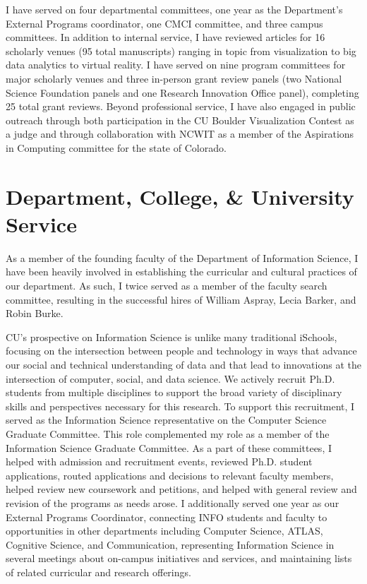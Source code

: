 \documentclass[11pt]{article}
\begin{document}
I have served on four departmental committees, one year as the Department's External Programs coordinator, one CMCI committee, and three campus committees. In addition to internal service, I have reviewed articles for 16 scholarly venues (95 total manuscripts) ranging in topic from visualization to big data analytics to virtual reality. I have served on nine program committees for major scholarly venues and three in-person grant review panels (two National Science Foundation panels and one Research Innovation Office panel), completing 25 total grant reviews. 
Beyond professional service, I have also engaged in public outreach through both participation in the CU Boulder Visualization Contest as a judge and through collaboration with NCWIT as a member of the Aspirations in Computing committee for the state of Colorado. 

\section*{Department, College, \& University Service}
As a member of the founding faculty of the Department of Information Science, I have been heavily involved in establishing the curricular and cultural practices of our department. As such, I twice served as a member of the faculty search committee, resulting in the successful hires of William Aspray, Lecia Barker, and Robin Burke. 

CU's prospective on Information Science is unlike many traditional iSchools, focusing on the intersection between people and technology in ways that advance our social and technical understanding of data and that lead to innovations at the intersection of computer, social, and data science. We actively recruit Ph.D. students from multiple disciplines to support the broad variety of disciplinary skills and perspectives necessary for this research. To support this recruitment, I served as the Information Science representative on the Computer Science Graduate Committee.
This role complemented my role as a member of the Information Science Graduate Committee. As a part of these committees, I helped with admission and recruitment events, reviewed Ph.D. student applications, routed applications and decisions to relevant faculty members, helped review new coursework and petitions, and helped with general review and revision of the programs as needs arose. I additionally served one year as our External Programs Coordinator, connecting INFO students and faculty to opportunities in other departments including Computer Science, ATLAS, Cognitive Science, and Communication, representing Information Science in several meetings about on-campus initiatives and services, and maintaining lists of related curricular and research offerings.
\end{document}
